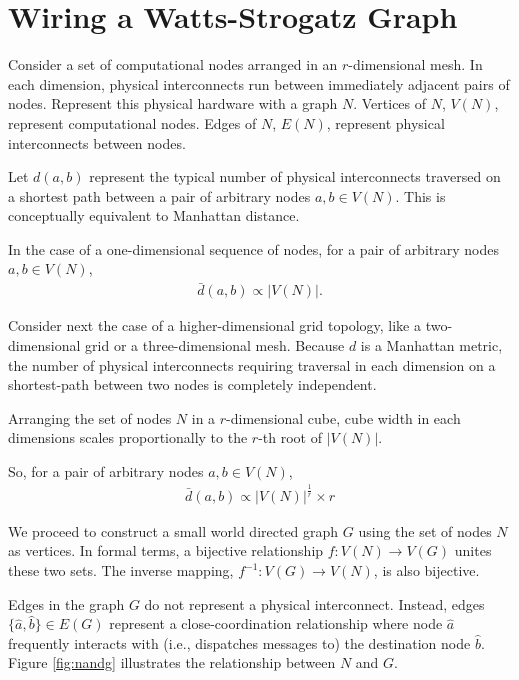 \section{Wiring a Watts-Strogatz Graph} \label{sec:proof4}

Consider a set of computational nodes arranged in an $r$-dimensional mesh.
In each dimension, physical interconnects run between immediately adjacent pairs of nodes.
Represent this physical hardware with a graph $N$.
Vertices of $N$, $V(N)$, represent computational nodes.
Edges of $N$, $E(N)$, represent physical interconnects between nodes.

Let $d(a,b)$ represent the typical number of physical interconnects traversed on a shortest path between a pair of arbitrary nodes $a, b \in V(N)$.
This is conceptually equivalent to Manhattan distance.

In the case of a one-dimensional sequence of nodes, for a pair of arbitrary nodes $a,b \in V(N)$,
\begin{align*}
\bar{d}(a,b) \propto |V(N)|.
\end{align*}

Consider next the case of a higher-dimensional grid topology, like a two-dimensional grid or a three-dimensional mesh.
Because $d$ is a Manhattan metric, the number of physical interconnects requiring traversal in each dimension on a shortest-path between two nodes is completely independent.

Arranging the set of nodes $N$ in a $r$-dimensional cube, cube width in each dimensions scales proportionally to the $r$-th root of $|V(N)|$.

So, for a pair of arbitrary nodes $a,b \in V(N)$,
\begin{align} \label{eqn:mesh_prop}
\bar{d}(a, b) \propto |V(N)|^{\frac{1}{r}} \times r
\end{align}

We proceed to construct a small world directed graph $G$ using the set of nodes $N$ as vertices.
In formal terms, a bijective relationship $f: V(N) \rightarrow V(G)$ unites these two sets.
The inverse mapping, $f^{-1}: V(G) \rightarrow V(N)$, is also bijective.



Edges in the graph $G$ do not represent a physical interconnect.
Instead, edges $\{\hat{a}, \hat{b}\} \in E(G)$ represent a close-coordination relationship where node $\hat{a}$ frequently interacts with (i.e., dispatches messages to) the destination node $\hat{b}$.
Figure \ref{fig:nandg} illustrates the relationship between $N$ and $G$.

